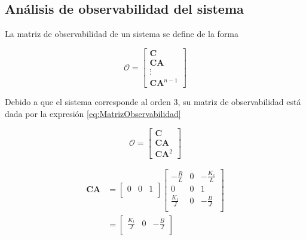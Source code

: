 
\subsection{Análisis de observabilidad del sistema}
La matriz de observabilidad de un sistema se define de la forma

\begin{equation}
  \mathcal{O} = \begin{bmatrix}
    \mathbf{C} \\ \mathbf{C}\mathbf{A} \\ \vdots \\ \mathbf{C}\mathbf{A}^{n-1}
  \end{bmatrix} 
\end{equation}

Debido a que el sistema corresponde al orden 3, su matriz de observabilidad
está dada por la expresión \eqref{eq:MatrizObservabilidad}

\begin{equation}
  \mathcal{O} = \begin{bmatrix}
    \mathbf{C} \\ \mathbf{C}\mathbf{A} \\ \mathbf{C}\mathbf{A}^{2}
  \end{bmatrix} 
  \label{eq:MatrizObservabilidad}
\end{equation}

\begin{equation*}
  \begin{aligned}
    \mathbf{CA} &= 
    \begin{bmatrix}
      0 &
      0 &
      1 \\
    \end{bmatrix}
    \begin{bmatrix}
      -\frac{R}{L}  & 0 & -\frac{K_e}{L} \\
      0             & 0 &  1             \\
      \frac{K_t}{J} & 0 & -\frac{B}{J}   \\
    \end{bmatrix} \\
     &= 
    \begin{bmatrix}
      \frac{K_t}{J} & 0 & -\frac{B}{J}   \\
    \end{bmatrix}
  \end{aligned}
\end{equation*}

